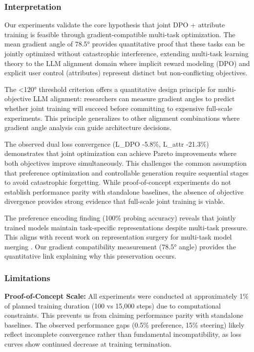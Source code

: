 
\subsubsection{Interpretation}

Our experiments validate the core hypothesis that joint DPO + attribute training is feasible through gradient-compatible multi-task optimization. The mean gradient angle of 78.5° provides quantitative proof that these tasks can be jointly optimized without catastrophic interference, extending multi-task learning theory to the LLM alignment domain where implicit reward modeling (DPO) and explicit user control (attributes) represent distinct but non-conflicting objectives.

The <120° threshold criterion offers a quantitative design principle for multi-objective LLM alignment: researchers can measure gradient angles to predict whether joint training will succeed before committing to expensive full-scale experiments. This principle generalizes to other alignment combinations where gradient angle analysis can guide architecture decisions.

The observed dual loss convergence (L\_DPO -5.8\%, L\_attr -21.3\%) demonstrates that joint optimization can achieve Pareto improvements where both objectives improve simultaneously. This challenges the common assumption that preference optimization and controllable generation require sequential stages to avoid catastrophic forgetting. While proof-of-concept experiments do not establish performance parity with standalone baselines, the absence of objective divergence provides strong evidence that full-scale joint training is viable.

The preference encoding finding (100\% probing accuracy) reveals that jointly trained models maintain task-specific representations despite multi-task pressure. This aligns with recent work on representation surgery for multi-task model merging \citep{Yang2024RepresentationSurgery}. Our gradient compatibility measurement (78.5° angle) provides the quantitative link explaining why this preservation occurs.

\subsubsection{Limitations}

\textbf{Proof-of-Concept Scale:} All experiments were conducted at approximately 1\% of planned training duration (100 vs 15,000 steps) due to computational constraints. This prevents us from claiming performance parity with standalone baselines. The observed performance gaps (0.5\% preference, 15\% steering) likely reflect incomplete convergence rather than fundamental incompatibility, as loss curves show continued decrease at training termination.

